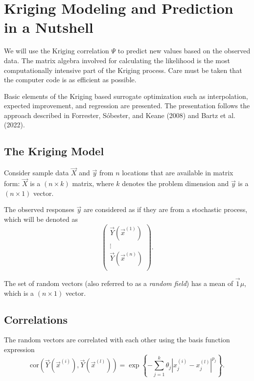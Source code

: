\documentclass[
  letterpaper,
  DIV=11,
  numbers=noendperiod]{scrreprt}
\begin{document}
\hypertarget{kriging-modeling-and-prediction-in-a-nutshell}{%
\section{Kriging Modeling and Prediction in a
Nutshell}\label{kriging-modeling-and-prediction-in-a-nutshell}}

We will use the Kriging correlation \(\Psi\) to predict new values based
on the observed data. The matrix algebra involved for calculating the
likelihood is the most computationally intensive part of the Kriging
process. Care must be taken that the computer code is as efficient as
possible.

Basic elements of the Kriging based surrogate optimization such as
interpolation, expected improvement, and regression are presented. The
presentation follows the approach described in Forrester, Sóbester, and
Keane (2008) and Bartz et al. (2022).

\hypertarget{the-kriging-model}{%
\subsection{The Kriging Model}\label{the-kriging-model}}

Consider sample data \(\vec{X}\) and \(\vec{y}\) from \(n\) locations
that are available in matrix form: \(\vec{X}\) is a \((n \times k)\)
matrix, where \(k\) denotes the problem dimension and \(\vec{y}\) is a
\((n\times 1)\) vector.

The observed responses \(\vec{y}\) are considered as if they are from a
stochastic process, which will be denoted as \[
\begin{pmatrix}
\vec{Y}(\vec{x}^{(1)})\\
\vdots\\
\vec{Y}(\vec{x}^{(n)})\\
\end{pmatrix}.
\]

The set of random vectors (also referred to as a \emph{random field})
has a mean of \(\vec{1} \mu\), which is a \((n\times 1)\) vector.

\hypertarget{correlations}{%
\subsection{Correlations}\label{correlations}}

The random vectors are correlated with each other using the basis
function expression \[
\text{cor} \left(\vec{Y}(\vec{x}^{(i)}),\vec{Y}(\vec{x}^{(l)}) \right) = \exp\left\{ - \sum_{j=1}^k \theta_j |x_j^{(i)} - x_j^{(l)} |^{p_j}\right\}.
\]
\end{document}
